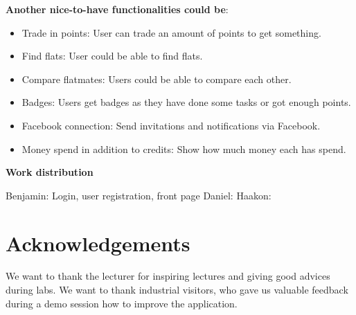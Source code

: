 \documentclass{sig-alt-release2}
\begin{document}
\textbf{Another nice-to-have functionalities could be}:
\begin{itemize}
\item Trade in points: User can trade an amount of points to get something.
\item Find flats: User could be able to find flats.
\item Compare flatmates: Users could be able to compare each other.
\item Badges: Users get badges as they have done some tasks or got enough points.
\item Facebook connection: Send invitations and notifications via Facebook.
\item Money spend in addition to credits: Show how much money each has spend.
\end{itemize}

\textbf{Work distribution}

Benjamin: Login, user registration, front page
Daniel:
Haakon:

\section{Acknowledgements}

We want to thank the lecturer for inspiring lectures and giving good advices during labs.
We want to thank industrial visitors, who gave us valuable feedback during a demo session how to improve the application.




\appendix
\end{document}
